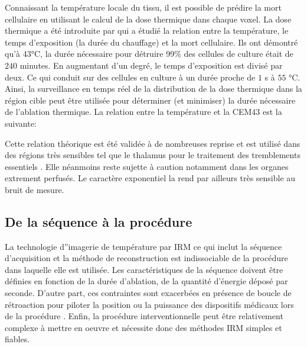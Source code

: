 \documentclass[10pt,a4paper]{report}
\begin{document}
Connaissant la température locale du tissu, il est possible de prédire la mort cellulaire en utilisant le calcul de la dose thermique dans chaque voxel. La dose thermique a été introduite par \cite{sapareto1984thermal} qui a étudié la relation entre la température, le temps d'exposition (la durée du chauffage) et la mort cellulaire. Ils ont démontré qu'à 43°C, la durée nécessaire pour détruire 99\% des cellules de culture était de $240$ minutes. En augmentant d'un degré, le temps d'exposition est divisé par deux. Ce qui conduit sur des cellules en culture à un durée proche de $1$ s à $55$ °C. Ainsi, la surveillance en temps réel de la distribution de la dose thermique dans la région cible peut être utilisée pour déterminer (et minimiser) la durée nécessaire de l'ablation thermique. La relation entre la température et la \ac{CEM43} est la suivante:


Cette relation théorique est été validée à de nombreuses reprise et est utilisé dans des régions très sensibles tel que le thalamus pour le traitement des tremblements essentiels \cite{huang2018predicting}. Elle néanmoins reste sujette à caution \cite{o2012estimation} notamment dans les organes extrement perfusés. Le caractère exponentiel la rend par ailleurs très sensible au bruit de mesure.  

\subsection{De la séquence à la procédure}

La technologie d''imagerie de température par IRM ce qui inclut la séquence d'acquisition et la méthode de reconstruction est indissociable de la procédure dans laquelle elle est utilisée. Les caractéristiques de la séquence doivent être définies en fonction de la durée d'ablation, de la quantité d'énergie déposé par seconde. D'autre part, ces contraintes sont exacerbées en présence de boucle de rétroaction pour piloter la position ou la puissance des dispositifs médicaux lors de la procédure \cite{bour2018real,desclides2023real, ozenne2016automatic}. Enfin, la procédure interventionnelle peut être relativement complexe à mettre en oeuvre et nécessite donc des méthodes IRM simples et fiables.\\
\end{document}
